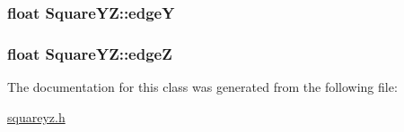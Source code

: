 \subsubsection[{\texorpdfstring{edgeY}{edgeY}}]{\setlength{\rightskip}{0pt plus 5cm}float Square\+Y\+Z\+::edgeY\hspace{0.3cm}{\ttfamily [private]}}\hypertarget{classSquareYZ_a6d7f81cfc7814c9d3f948b0115606254}{}\label{classSquareYZ_a6d7f81cfc7814c9d3f948b0115606254}
\subsubsection[{\texorpdfstring{edgeZ}{edgeZ}}]{\setlength{\rightskip}{0pt plus 5cm}float Square\+Y\+Z\+::edgeZ\hspace{0.3cm}{\ttfamily [private]}}\hypertarget{classSquareYZ_a87fc6f3c129ce52756296f2cbf402bc6}{}\label{classSquareYZ_a87fc6f3c129ce52756296f2cbf402bc6}


The documentation for this class was generated from the following file\+:\begin{DoxyCompactItemize}
\item 
\hyperlink{squareyz_8h}{squareyz.\+h}\end{DoxyCompactItemize}
